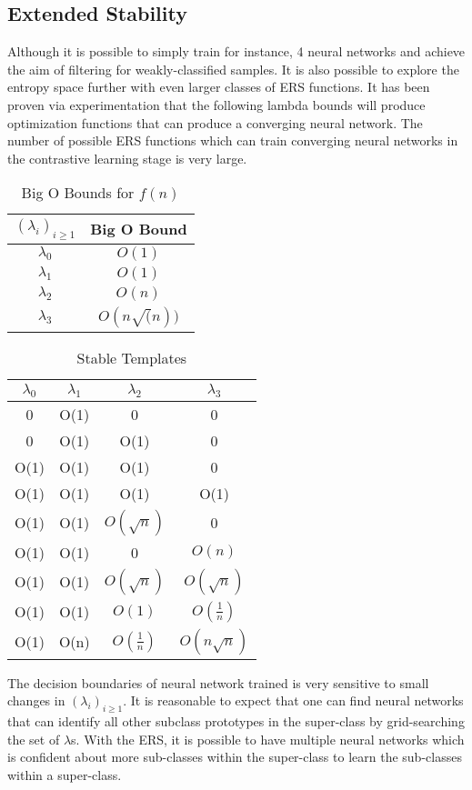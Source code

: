 \documentclass[10pt,twocolumn,letterpaper]{article}
\begin{document}
\subsection{Extended Stability}
Although it is possible to simply train for instance, 4 neural networks and achieve the aim of filtering for weakly-classified samples. It is also possible to explore the entropy space further with even larger classes of ERS functions. It has been proven via experimentation that the following lambda bounds will produce optimization functions that can produce a converging neural network. The number of possible ERS functions which can train converging neural networks in the contrastive learning stage is very large. 

\begin{table}[h]
\centering
\caption{Big O Bounds for $f(n)$}
\label{tab:tabel3}
\begin{tabular}{|c|c|}
\hline
$(\lambda_{i})_{i \geq 1} $ & Big O Bound  \\ \hline
$\lambda_{0}$ & $O(1)$ \\
$\lambda_{1}$ & $O(1)$ \\
$\lambda_{2}$ & $O(n)$ \\
$\lambda_{3}$ & $O(n\sqrt(n))$ \\
\hline
\end{tabular}
\end{table}

\begin{table}[h]
\centering
\caption{Stable Templates}
\label{tab:tabela1}
\begin{tabular}{|c|c|c|c|}
\hline
$\lambda_{0}$ & $\lambda_{1}$ & $\lambda_{2}$ & $\lambda_{3}$  \\ \hline
0 & O(1) & 0 & 0 \\
0 & O(1) & O(1) & 0 \\
O(1) & O(1) & O(1) & 0 \\
O(1) & O(1) & O(1) & O(1) \\
O(1) & O(1) & $O(\sqrt{n})$ & 0 \\
O(1) & O(1) & 0 & $O(n)$ \\
O(1) & O(1) & $O(\sqrt{n})$ & $O(\sqrt{n})$ \\
O(1) & O(1) & $O(1)$ & $O(\frac{1}{n})$  \\
O(1) & O(n) & $O(\frac{1}{n})$ & $O(n\sqrt{n})$ \\
\hline
\end{tabular}
\end{table}

The decision boundaries of neural network trained is very sensitive to small changes in $(\lambda_{i})_{i \geq 1}$. It is reasonable to expect that one can find neural networks that can identify all other subclass prototypes in the super-class by grid-searching the set of $\lambda$s. With the ERS, it is possible to have multiple neural networks which is confident about more sub-classes within the super-class to learn the sub-classes within a super-class. 
\end{document}
